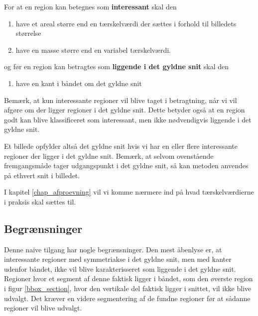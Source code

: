 {\noindent For at en region kan betegnes som \textbf{interessant} skal den
\begin{enumerate}
        \renewcommand{\labelenumi}{(\alph{enumi})}
    \item have et areal større end en tærskelværdi der sættes i
        forhold til billedets størrelse
    \item have en masse større end en variabel tærskelværdi.
\end{enumerate}
og før en region kan betragtes som \textbf{liggende i det gyldne
snit} skal den
\begin{enumerate}
        \renewcommand{\labelenumi}{(\alph{enumi})}
        \setcounter{enumi}{2}
    \item have en kant i båndet om det gyldne snit
\end{enumerate}

Bemærk, at kun interessante regioner vil blive taget i betragtning, når vi vil
afgøre om der ligger regioner i det gyldne snit. Dette betyder også at
en region godt kan blive klassificeret som interessant, men ikke
nødvendigvis liggende i det gyldne snit.

Et billede opfylder altså det gyldne snit hvis vi har en eller flere
interessante regioner der ligger i det gyldne snit. Bemærk, at selvom
ovenstående fremgangsmåde tager udgangspunkt i det gyldne snit, så kan
metoden anvendes på ethvert snit i billedet.

I kapitel \ref{chap_afproevning} vil vi komme nærmere ind på hvad
tærskelværdierne i praksis skal sættes til.

\subsection{Begrænsninger}
Denne naive tilgang har nogle begrænsninger.  Den mest åbenlyse er, at
interessante regioner med symmetriakse i det gyldne snit, men med kanter udenfor
båndet, ikke vil blive karakterisseret som liggende i det gyldne snit.
Regioner hvor et segment af denne faktisk ligger i båndet, som den
øverste region i figur \ref{bbox_section}, hvor den vertikale del faktisk
ligger i snittet, vil ikke blive udvalgt.  Det kræver en videre
segmentering af de fundne regioner før at sådanne regioner vil blive
udvalgt.

}

